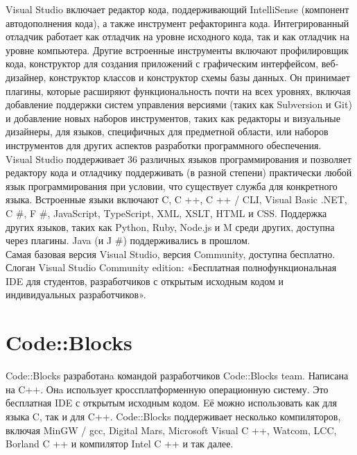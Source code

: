 Visual Studio включает редактор кода, поддерживающий IntelliSense (компонент автодополнения кода), а 
также инструмент рефакторинга кода. Интегрированный отладчик работает как отладчик на уровне 
исходного кода, так и как отладчик на уровне компьютера. Другие встроенные инструменты включают
профилировщик кода, конструктор для создания приложений с графическим интерфейсом, веб-дизайнер,
конструктор классов и конструктор схемы базы данных. Он принимает плагины, которые расширяют
функциональность почти на всех уровнях, включая добавление поддержки систем управления версиями 
(таких как Subversion и Git) и добавление новых наборов инструментов, таких как редакторы и 
визуальные дизайнеры, для языков, специфичных для предметной области, или наборов инструментов для 
других аспектов разработки программного обеспечения.\\

Visual Studio поддерживает 36 различных языков программирования и позволяет редактору кода и 
отладчику поддерживать (в разной степени) практически любой язык программирования при условии, 
что существует служба для конкретного языка. Встроенные языки включают C, C ++, C ++ / CLI, Visual 
Basic .NET, C #, F #, JavaScript, TypeScript, XML, XSLT, HTML и CSS. Поддержка других языков, 
таких как Python, Ruby, Node.js и M среди других, доступна через плагины. Java (и J #) 
поддерживались в прошлом.\\

Самая базовая версия Visual Studio, версия Community, доступна бесплатно. Слоган Visual Studio 
Community edition: «Бесплатная полнофункциональная IDE для студентов, разработчиков с открытым 
исходным кодом и индивидуальных разработчиков».\\

\section{Code::Blocks}
Code::Blocks разработанa командой разработчиков Code::Blocks team. Написана на C++. Онa использует
кроссплатформенную операционную систему. Это бесплатная IDE с открытым исходным кодом. Eё можно
использовать как для языка C, так и для C++. Code::Blocks поддерживает несколько компиляторов, 
включая MinGW / gcc, Digital Mars, Microsoft Visual C ++, Watcom, LCC, Borland C ++ и компилятор 
Intel C ++ и так далее.\\ 

